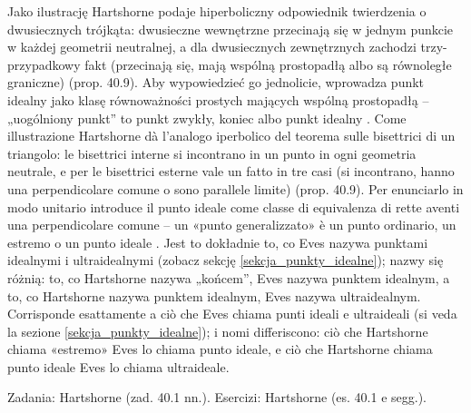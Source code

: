 Jako ilustrację Hartshorne podaje hiperboliczny odpowiednik twierdzenia o dwusiecznych trójkąta: dwusieczne wewnętrzne przecinają się w jednym punkcie w każdej geometrii neutralnej, a dla dwusiecznych zewnętrznych zachodzi trzy-przypadkowy fakt (przecinają się, mają wspólną prostopadłą albo są równoległe graniczne) \cite[s. 382--384]{hartshorne_2000} (prop. 40.9). %
Aby wypowiedzieć go jednolicie, wprowadza punkt idealny jako klasę równoważności prostych mających wspólną prostopadłą -- „uogólniony punkt'' to punkt zwykły, koniec albo punkt idealny \cite[s. 384]{hartshorne_2000}. %
Come illustrazione Hartshorne dà l'analogo iperbolico del teorema sulle bisettrici di un triangolo: le bisettrici interne si incontrano in un punto in ogni geometria neutrale, e per le bisettrici esterne vale un fatto in tre casi (si incontrano, hanno una perpendicolare comune o sono parallele limite) \cite[p. 382--384]{hartshorne_2000} (prop. 40.9). %
Per enunciarlo in modo unitario introduce il punto ideale come classe di equivalenza di rette aventi una perpendicolare comune -- un «punto generalizzato» è un punto ordinario, un estremo o un punto ideale \cite[p. 384]{hartshorne_2000}. %
Jest to dokładnie to, co Eves nazywa punktami idealnymi i ultraidealnymi (zobacz sekcję \ref{sekcja_punkty_idealne}); nazwy się różnią: to, co Hartshorne nazywa „końcem'', Eves nazywa punktem idealnym, a to, co Hartshorne nazywa punktem idealnym, Eves nazywa ultraidealnym. %
Corrisponde esattamente a ciò che Eves chiama punti ideali e ultraideali (si veda la sezione \ref{sekcja_punkty_idealne}); i nomi differiscono: ciò che Hartshorne chiama «estremo» Eves lo chiama punto ideale, e ciò che Hartshorne chiama punto ideale Eves lo chiama ultraideale. %

Zadania: Hartshorne \cite[s. 384 nn.]{hartshorne_2000} (zad. 40.1 nn.). %
Esercizi: Hartshorne \cite[p. 384 e segg.]{hartshorne_2000} (es. 40.1 e segg.). %
